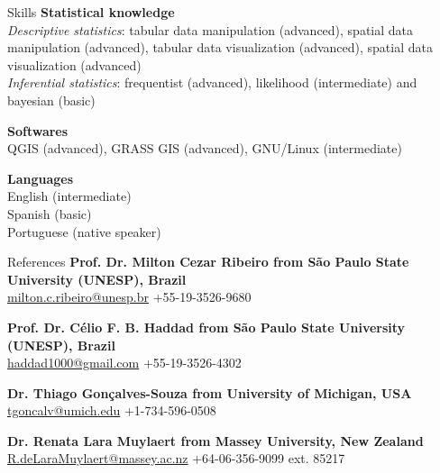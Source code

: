 \documentclass{resume}
\begin{document}
\begin{rSection}{Skills}
{\bf Statistical knowledge}
\\ {\it Descriptive statistics}: tabular data manipulation (advanced), spatial data manipulation (advanced), tabular data visualization (advanced), spatial data visualization (advanced)
\\ {\it Inferential statistics}: frequentist (advanced), likelihood (intermediate) and bayesian (basic)

{\bf Softwares}
\\ QGIS (advanced), GRASS GIS (advanced), GNU/Linux (intermediate)

{\bf Languages}
\\ English (intermediate)
\\ Spanish (basic)
\\ Portuguese (native speaker)

\end{rSection}


\begin{rSection}{References}
{\bf Prof. Dr. Milton Cezar Ribeiro from São Paulo State University (UNESP), Brazil} 
\\ \underline{milton.c.ribeiro@unesp.br} +55-19-3526-9680

{\bf Prof. Dr. Célio F. B. Haddad from São Paulo State University (UNESP), Brazil} 
\\ \underline{haddad1000@gmail.com} +55-19-3526-4302

{\bf Dr. Thiago Gonçalves-Souza from University of Michigan, USA} 
\\ \underline{tgoncalv@umich.edu} +1-734-596-0508

{\bf Dr. Renata Lara Muylaert from Massey University, New Zealand} 
\\ \underline{R.deLaraMuylaert@massey.ac.nz} +64-06-356-9099 ext. 85217

\end{rSection}
\end{document}

